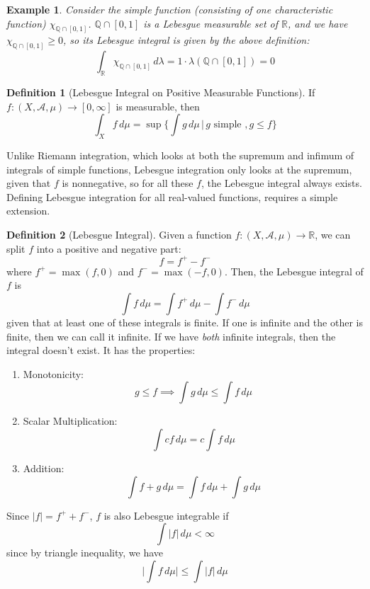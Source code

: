 \documentclass{article}
\newtheorem{example}{Example}[section]
\theoremstyle{remark}
\theoremstyle{definition}
\newtheorem{definition}{Definition}[section]
\begin{document}
\begin{example}
Consider the simple function (consisting of one characteristic function) $\chi_{\mathbb{Q} \cap [0, 1]}$. $\mathbb{Q} \cap [0, 1]$ is a Lebesgue measurable set of $\mathbb{R}$, and we have $\chi_{\mathbb{Q} \cap [0, 1]} \geq 0$, so its Lebesgue integral is given by the above definition: 
\[\int_{\mathbb{R}} \chi_{\mathbb{Q} \cap [0, 1]} \, d\lambda = 1 \cdot \lambda(\mathbb{Q} \cap [0, 1]) = 0\]
\end{example}

\begin{definition}[Lebesgue Integral on Positive Measurable Functions]
If $f: (X, \mathcal{A}, \mu) \longrightarrow [0, \infty]$ is measurable, then 
\[\int_X f \, d\mu = \sup \Big\{ \int g\, d\mu \,\Big|\, g \text{ simple }, g \leq f\Big\}\]
\end{definition}

Unlike Riemann integration, which looks at both the supremum and infimum of integrals of simple functions, Lebesgue integration only looks at the supremum, given that $f$ is nonnegative, so for all these $f$, the Lebesgue integral always exists. Defining Lebesgue integration for all real-valued functions, requires a simple extension. 

\begin{definition}[Lebesgue Integral]
Given a function $f: (X, \mathcal{A}, \mu) \longrightarrow \mathbb{R}$, we can split $f$ into a positive and negative part: 
\[f = f^+ - f^-\]
where $f^+ = \max(f, 0)$ and $f^- = \max(-f, 0)$. Then, the Lebesgue integral of $f$ is 
\[\int f \, d \mu = \int f^+ \, d\mu - \int f^- \, d\mu\]
given that at least one of these integrals is finite. If one is infinite and the other is finite, then we can call it infinite. If we have \textit{both} infinite integrals, then the integral doesn't exist. It has the properties: 
\begin{enumerate}
    \item Monotonicity: 
    \[g \leq f \implies \int g \, d\mu \leq \int f\, d\mu\]
    \item Scalar Multiplication: 
    \[\int c f \, d\mu = c \int f \, d\mu\]
    \item Addition:
    \[\int f + g \, d\mu = \int f \,d\mu + \int g \,d\mu\]
\end{enumerate}
\end{definition}

Since $|f| = f^+ + f^-$, $f$ is also Lebesgue integrable if 
\[\int |f| \, d\mu < \infty \]
since by triangle inequality, we have 
\[\bigg| \int f \, d\mu \bigg| \leq \int |f| \, d \mu\]
\end{document}
